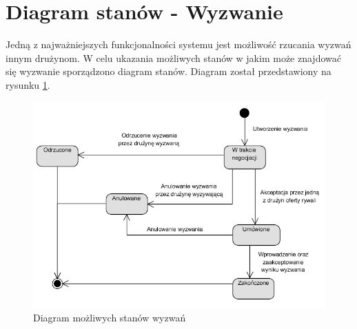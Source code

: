 \section{Diagram stanów - Wyzwanie}

Jedną z najważniejszych funkcjonalności systemu jest możliwość rzucania wyzwań innym drużynom. W celu ukazania możliwych stanów w jakim może znajdować się wyzwanie sporządzono diagram stanów. Diagram został przedstawiony na rysunku \ref{fig:diagram-stany-wyzwanie}. 

\begin{figure}[H]
\centering
\includegraphics[width=0.8\linewidth]{04-projekt/rys/state1.PNG}
\caption{Diagram możliwych stanów wyzwań}
\label{fig:diagram-stany-wyzwanie}
\end{figure}




